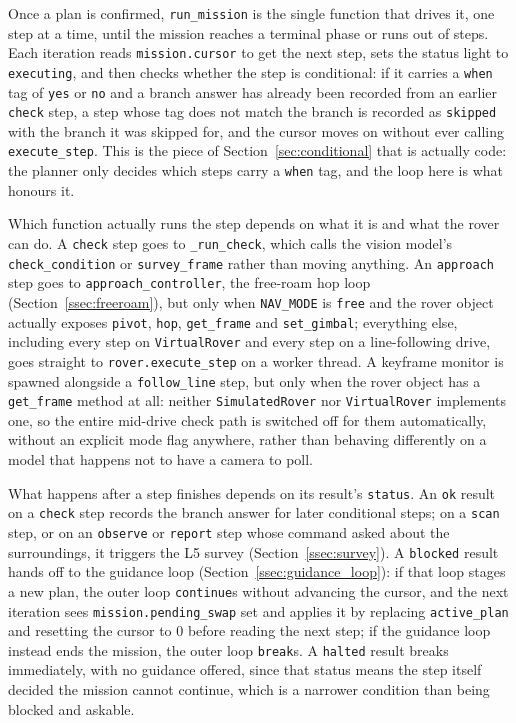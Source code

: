\label{ssec:mission_loop}

Once a plan is confirmed, \texttt{run\_mission} is the single function that
drives it, one step at a time, until the mission reaches a terminal phase or
runs out of steps. Each iteration reads \texttt{mission.cursor} to get the next
step, sets the status light to \texttt{executing}, and then checks whether the
step is conditional: if it carries a \texttt{when} tag of \texttt{yes} or
\texttt{no} and a branch answer has already been recorded from an earlier
\texttt{check} step, a step whose tag does not match the branch is recorded as
\texttt{skipped} with the branch it was skipped for, and the cursor moves on
without ever calling \texttt{execute\_step}. This is the piece of
Section~\ref{sec:conditional} that is actually code: the planner only decides
which steps carry a \texttt{when} tag, and the loop here is what honours it.

Which function actually runs the step depends on what it is and what the
rover can do. A \texttt{check} step goes to \texttt{\_run\_check}, which calls
the vision model's \texttt{check\_condition} or \texttt{survey\_frame} rather
than moving anything. An \texttt{approach} step goes to
\texttt{approach\_controller}, the free-roam hop loop
(Section~\ref{ssec:freeroam}), but only when \texttt{NAV\_MODE} is
\texttt{free} and the rover object actually exposes \texttt{pivot},
\texttt{hop}, \texttt{get\_frame} and \texttt{set\_gimbal}; everything else,
including every step on \texttt{VirtualRover} and every step on a
line-following drive, goes straight to \texttt{rover.execute\_step} on a
worker thread. A keyframe monitor is spawned alongside a \texttt{follow\_line}
step, but only when the rover object has a \texttt{get\_frame} method at all:
neither \texttt{SimulatedRover} nor \texttt{VirtualRover} implements one, so
the entire mid-drive check path is switched off for them automatically,
without an explicit mode flag anywhere, rather than behaving differently on
a model that happens not to have a camera to poll.

What happens after a step finishes depends on its result's \texttt{status}.
An \texttt{ok} result on a \texttt{check} step records the branch answer for
later conditional steps; on a \texttt{scan} step, or on an \texttt{observe} or
\texttt{report} step whose command asked about the surroundings, it triggers
the L5 survey (Section~\ref{ssec:survey}). A \texttt{blocked} result hands off
to the guidance loop (Section~\ref{ssec:guidance_loop}): if that loop stages a
new plan, the outer loop \texttt{continue}s without advancing the cursor,
and the next iteration sees \texttt{mission.pending\_swap} set and applies it
by replacing \texttt{active\_plan} and resetting the cursor to 0 before
reading the next step; if the guidance loop instead ends the mission, the
outer loop \texttt{break}s. A \texttt{halted} result breaks immediately, with
no guidance offered, since that status means the step itself decided the
mission cannot continue, which is a narrower condition than being blocked and
askable.

